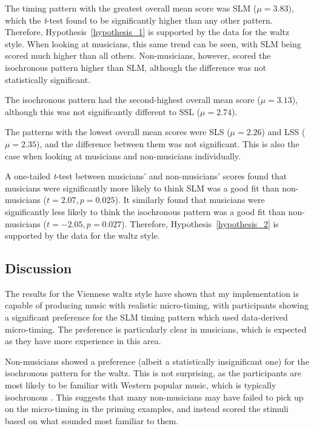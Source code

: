 \documentclass[12pt,twoside,openright]{report}
\begin{document}
The timing pattern with the greatest overall mean score was SLM ($\mu=3.83$), which
the \textit{t}-test found to be significantly higher than any other pattern. Therefore,
Hypothesis~\ref{hypothesis_1} is supported by the data for the waltz style. When looking
at musicians, this same trend can be seen, with SLM being scored much higher
than all others. Non-musicians, however, scored the isochronous pattern higher
than SLM, although the difference was not statistically significant.

The isochronous pattern had the second-highest overall mean score ($\mu=3.13$),
although this was not significantly different to SSL ($\mu=2.74$).

The patterns with the lowest overall mean scores were SLS ($\mu=2.26$) and LSS ($\mu=2.
35$), and the difference between them was not significant. This is also the case
when looking at musicians and non-musicians individually.

A one-tailed \textit{t}-test between musicians' and non-musicians' scores found that
musicians were significantly more likely to think SLM was a good fit than
non-musicians ($t=2.07, p=0.025$). It similarly found that musicians were
significantly less likely to think the isochronous pattern was a good fit than
non-musicians ($t=-2.05, p=0.027$). Therefore, Hypothesis~\ref{hypothesis_2} is supported by the
data for the waltz style.


\subsection{Discussion} \label{user_study_discussion}

The results for the Viennese waltz style have shown that my implementation is
capable of producing music with realistic micro-timing, with participants
showing a significant preference for the SLM timing pattern which used
data-derived micro-timing. The preference is particularly clear in musicians,
which is expected as they have more experience in this area.

Non-musicians showed a preference (albeit a statistically insignificant one) for the
isochronous pattern for the waltz. This is not surprising, as the participants
are most likely to be familiar with Western popular music, which is typically
isochronous \cite{soley2010}. This suggests that many non-musicians may have failed to pick up on
the micro-timing in the priming examples, and instead scored the stimuli based
on what sounded most familiar to them.
\end{document}
